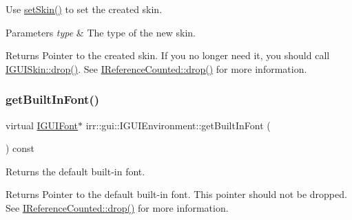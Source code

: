 Use \hyperlink{classirr_1_1gui_1_1IGUIEnvironment_ae7042c520e848643e080ad4532797f23}{set\+Skin()} to set the created skin. 
\begin{DoxyParams}{Parameters}
{\em type} & The type of the new skin. \\
\hline
\end{DoxyParams}
\begin{DoxyReturn}{Returns}
Pointer to the created skin. If you no longer need it, you should call \hyperlink{classirr_1_1IReferenceCounted_a03856a09355b89d178090c4a5f738543}{I\+G\+U\+I\+Skin\+::drop()}. See \hyperlink{classirr_1_1IReferenceCounted_a03856a09355b89d178090c4a5f738543}{I\+Reference\+Counted\+::drop()} for more information. 
\end{DoxyReturn}
\mbox{\label{classirr_1_1gui_1_1IGUIEnvironment_a896fbfcbad5ccf187a835827b439da93}} 
\subsubsection{\texorpdfstring{get\+Built\+In\+Font()}{getBuiltInFont()}}
{\footnotesize\ttfamily virtual \hyperlink{classirr_1_1gui_1_1IGUIFont}{I\+G\+U\+I\+Font}$\ast$ irr\+::gui\+::\+I\+G\+U\+I\+Environment\+::get\+Built\+In\+Font (\begin{DoxyParamCaption}{ }\end{DoxyParamCaption}) const\hspace{0.3cm}{\ttfamily [pure virtual]}}



Returns the default built-\/in font. 

\begin{DoxyReturn}{Returns}
Pointer to the default built-\/in font. This pointer should not be dropped. See \hyperlink{classirr_1_1IReferenceCounted_a03856a09355b89d178090c4a5f738543}{I\+Reference\+Counted\+::drop()} for more information. 
\end{DoxyReturn}
\mbox{\label{classirr_1_1gui_1_1IGUIEnvironment_a13ec41a31e1b9cdc317c0c6092c2b820}} 
